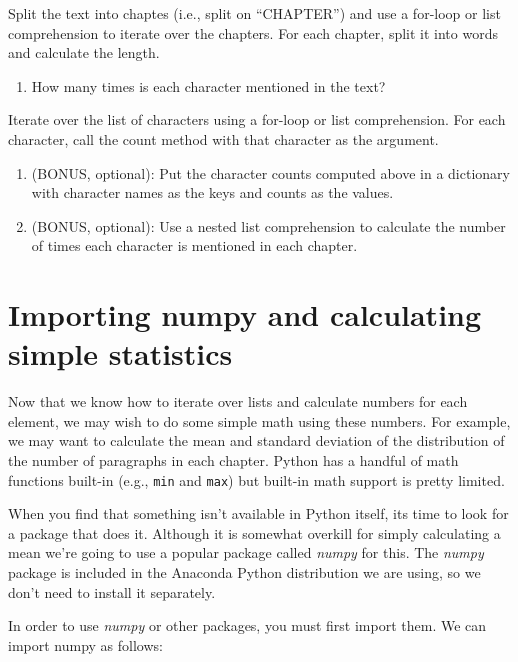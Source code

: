 \documentclass[]{book}
\providecommand{\tightlist}{%
  \setlength{\itemsep}{0pt}\setlength{\parskip}{0pt}}
\begin{document}
Split the text into chaptes (i.e., split on ``CHAPTER'') and use a
for-loop or list comprehension to iterate over the chapters. For each
chapter, split it into words and calculate the length.

\begin{enumerate}
\def\labelenumi{\arabic{enumi}.}
\setcounter{enumi}{2}
\tightlist
\item
  How many times is each character mentioned in the text?
\end{enumerate}

Iterate over the list of characters using a for-loop or list
comprehension. For each character, call the count method with that
character as the argument.

\begin{enumerate}
\def\labelenumi{\arabic{enumi}.}
\setcounter{enumi}{3}
\tightlist
\item
  (BONUS, optional): Put the character counts computed above in a
  dictionary with character names as the keys and counts as the values.
\item
  (BONUS, optional): Use a nested list comprehension to calculate the
  number of times each character is mentioned in each chapter.
\end{enumerate}

\section{Importing numpy and calculating simple
statistics}\label{importing-numpy-and-calculating-simple-statistics}

Now that we know how to iterate over lists and calculate numbers for
each element, we may wish to do some simple math using these numbers.
For example, we may want to calculate the mean and standard deviation of
the distribution of the number of paragraphs in each chapter. Python has
a handful of math functions built-in (e.g., \texttt{min} and
\texttt{max}) but built-in math support is pretty limited.

When you find that something isn't available in Python itself, its time
to look for a package that does it. Although it is somewhat overkill for
simply calculating a mean we're going to use a popular package called
\emph{numpy} for this. The \emph{numpy} package is included in the
Anaconda Python distribution we are using, so we don't need to install
it separately.

In order to use \emph{numpy} or other packages, you must first import
them. We can import numpy as follows:
\end{document}
